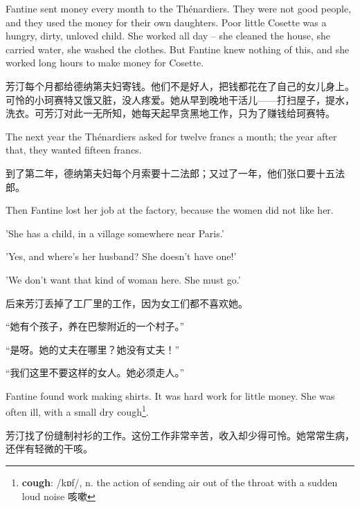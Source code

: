 \documentclass[fontset=ubuntu, zihao=5]{ctexart}
\newcommand\doulos[1]{{\fontspec{Doulos SIL} /#1/}}
\begin{document}
\begin{paracol}{2}
  \sectionbreak

  Fantine sent money every month to the Thénardiers. They were not good people, and they used the money for their own daughters. Poor little Cosette was a hungry, dirty, unloved child. She worked all day – she cleaned the house, she carried water, she washed the clothes. But Fantine knew nothing of this, and she worked long hours to make money for Cosette.

  \switchcolumn

  \sectionbreak

  芳汀每个月都给德纳第夫妇寄钱。他们不是好人，把钱都花在了自己的女儿身上。可怜的小珂赛特又饿又脏，没人疼爱。她从早到晚地干活儿——打扫屋子，提水，洗衣。可芳汀对此一无所知，她每天起早贪黑地工作，只为了赚钱给珂赛特。

  \switchcolumn*

  The next year the Thénardiers asked for twelve francs a month; the year after that, they wanted fifteen francs.

  \switchcolumn

  到了第二年，德纳第夫妇每个月索要十二法郎；又过了一年，他们张口要十五法郎。

  \switchcolumn*

  Then Fantine lost her job at the factory, because the women did not like her.


  'She has a child, in a village somewhere near Paris.'


  'Yes, and where's her husband? She doesn't have one!'


  'We don't want that kind of woman here. She must go.'


  \switchcolumn

  后来芳汀丢掉了工厂里的工作，因为女工们都不喜欢她。


  “她有个孩子，养在巴黎附近的一个村子。”


  “是呀。她的丈夫在哪里？她没有丈夫！”


  “我们这里不要这样的女人。她必须走人。”

  \switchcolumn*

  Fantine found work making shirts. It was hard work for little money. She was
  often ill, with a small dry cough\footnote{\textbf{cough}: \doulos{kɒf}, n.
    the action of sending air out of the throat with a sudden loud noise 咳嗽}.

  \switchcolumn

  芳汀找了份缝制衬衫的工作。这份工作非常辛苦，收入却少得可怜。她常常生病，还伴有轻微的干咳。


\end{paracol}
\end{document}
